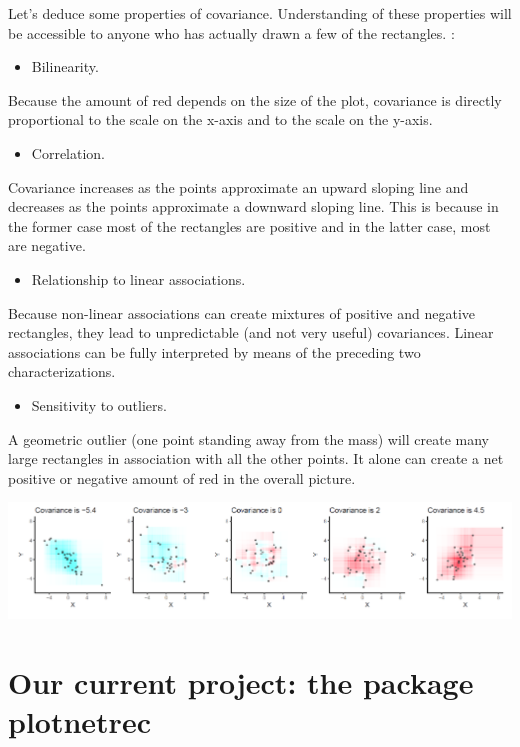 \documentclass[
]{report}
\providecommand{\tightlist}{%
  \setlength{\itemsep}{0pt}\setlength{\parskip}{0pt}}
\begin{document}
Let's deduce some properties of covariance. Understanding of these properties will be accessible to anyone who has actually drawn a few of the rectangles. :

\begin{itemize}
\tightlist
\item
  Bilinearity.
\end{itemize}

Because the amount of red depends on the size of the plot, covariance is directly proportional to the scale on the x-axis and to the scale on the y-axis.

\begin{itemize}
\tightlist
\item
  Correlation.
\end{itemize}

Covariance increases as the points approximate an upward sloping line and decreases as the points approximate a downward sloping line. This is because in the former case most of the rectangles are positive and in the latter case, most are negative.

\begin{itemize}
\tightlist
\item
  Relationship to linear associations.
\end{itemize}

Because non-linear associations can create mixtures of positive and negative rectangles, they lead to unpredictable (and not very useful) covariances. Linear associations can be fully interpreted by means of the preceding two characterizations.

\begin{itemize}
\tightlist
\item
  Sensitivity to outliers.
\end{itemize}

A geometric outlier (one point standing away from the mass) will create many large rectangles in association with all the other points. It alone can create a net positive or negative amount of red in the overall picture.

\includegraphics{covRect.PNG}

\hypertarget{our-current-project-the-package-plotnetrec}{%
\section{Our current project: the package plotnetrec}\label{our-current-project-the-package-plotnetrec}}
\end{document}
